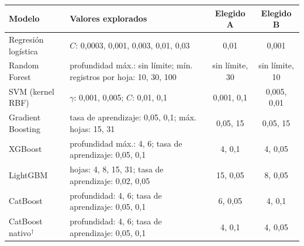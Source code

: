 \begin{tabular}{>{\raggedright\arraybackslash}p{2.9cm}>{\raggedright\arraybackslash}p{7.3cm}cc}
\toprule
Modelo & Valores explorados & Elegido A & Elegido B \\
\midrule
Regresión logística & $C$: 0{,}0003, 0{,}001, 0{,}003, 0{,}01, 0{,}03 & 0{,}01 & 0{,}001 \\
Random Forest & profundidad máx.: sin límite; mín. registros por hoja: 10, 30, 100 & sin límite, 30 & sin límite, 10 \\
SVM (kernel RBF) & $\gamma$: 0{,}001, 0{,}005; $C$: 0{,}01, 0{,}1 & 0{,}001, 0{,}1 & 0{,}005, 0{,}01 \\
Gradient Boosting & tasa de aprendizaje: 0{,}05, 0{,}1; máx. hojas: 15, 31 & 0{,}05, 15 & 0{,}05, 15 \\
XGBoost & profundidad máx.: 4, 6; tasa de aprendizaje: 0{,}05, 0{,}1 & 4, 0{,}1 & 4, 0{,}05 \\
LightGBM & hojas: 4, 8, 15, 31; tasa de aprendizaje: 0{,}02, 0{,}05 & 15, 0{,}05 & 8, 0{,}05 \\
CatBoost & profundidad: 4, 6; tasa de aprendizaje: 0{,}05, 0{,}1 & 6, 0{,}05 & 4, 0{,}1 \\
CatBoost nativo$^{\dagger}$ & profundidad: 4, 6; tasa de aprendizaje: 0{,}05, 0{,}1 & 4, 0{,}1 & 4, 0{,}05 \\
\bottomrule
\end{tabular}
